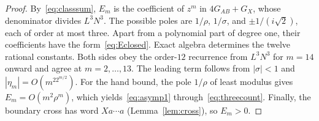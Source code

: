 \begin{proof}
By~\eqref{eq:classsum}, $E_m$ is the coefficient of $z^m$
in $4G_{AB}+G_X$, whose denominator divides $L^3N^3$.
The possible poles are $1/\rho$, $1/\sigma$, and $\pm1/(i\sqrt2)$,
each of order at most three. Apart from a polynomial part of degree one,
their coefficients have the form~\eqref{eq:Eclosed}.
Exact algebra determines the twelve rational constants. Both sides obey the order-$12$ recurrence
from $L^3N^3$ for $m=14$ onward and agree at $m=2,\dots,13$.
The leading term follows from $|\sigma|<1$ and
$|\eta_m|=O(m^22^{m/2})$. For the hand bound, the pole $1/\rho$
of least modulus gives $E_m=O(m^2\rho^m)$, which yields~\eqref{eq:asymp1}
through~\eqref{eq:threecount}. Finally, the boundary cross has word
$Xa\cdots a$ (Lemma~\ref{lem:cross}), so $E_m>0$.
\end{proof}
